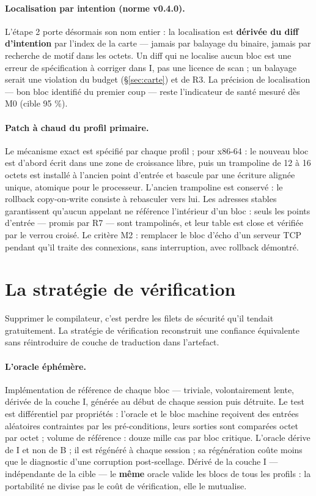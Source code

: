 \paragraph{Localisation par intention (norme v0.4.0).} L’étape 2 porte désormais son nom
entier : la localisation est \textbf{dérivée du diff d’intention} par l’index de la carte
— jamais par balayage du binaire, jamais par recherche de motif dans les octets. Un diff
qui ne localise aucun bloc est une erreur de spécification à corriger dans I, pas une
licence de scan ; un balayage serait une violation du budget (§\ref{sec:carte}) et de R3.
La précision de localisation — bon bloc identifié du premier coup — reste l’indicateur de
santé mesuré dès M0 (cible 95 \%).

\paragraph{Patch à chaud du profil primaire.} Le mécanisme exact est spécifié par chaque
profil ; pour x86-64 : le nouveau bloc est d’abord écrit dans une zone de croissance
libre, puis un trampoline de 12 à 16 octets est installé à l’ancien point d’entrée et
bascule par une écriture alignée unique, atomique pour le processeur. L’ancien trampoline
est conservé : le rollback copy-on-write consiste à rebasculer vers lui. Les adresses
stables garantissent qu’aucun appelant ne référence l’intérieur d’un bloc : seuls les
points d’entrée — promis par R7 — sont trampolinés, et leur table est close et vérifiée
par le verrou croisé. Le critère M2 : remplacer le bloc d’écho d’un serveur TCP pendant
qu’il traite des connexions, sans interruption, avec rollback démontré.

\section{La stratégie de vérification}\label{sec:verification}

Supprimer le compilateur, c’est perdre les filets de sécurité qu’il tendait gratuitement.
La stratégie de vérification reconstruit une confiance équivalente sans réintroduire de
couche de traduction dans l’artefact.

\paragraph{L’oracle éphémère.} Implémentation de référence de chaque bloc — triviale,
volontairement lente, dérivée de la couche I, générée au début de chaque session puis
détruite. Le test est différentiel par propriétés : l’oracle et le bloc machine reçoivent
des entrées aléatoires contraintes par les pré-conditions, leurs sorties sont comparées
octet par octet ; volume de référence : douze mille cas par bloc critique. L’oracle dérive
de I et non de B ; il est régénéré à chaque session ; sa régénération coûte moins que le
diagnostic d’une corruption post-scellage. Dérivé de la couche I — indépendante de la
cible — le \textbf{même} oracle valide les blocs de tous les profils : la portabilité ne
divise pas le coût de vérification, elle le mutualise.

